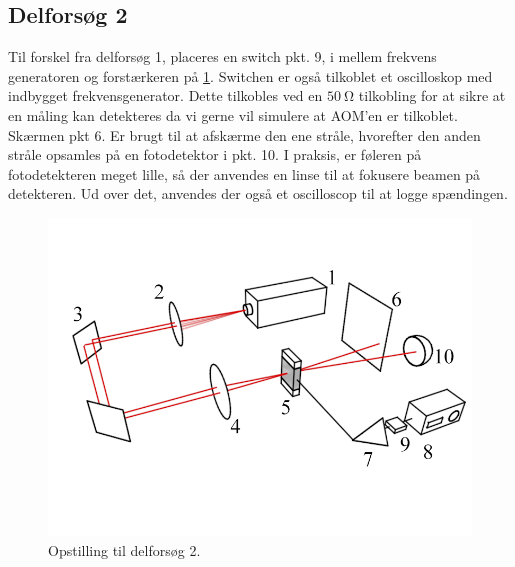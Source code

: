 \documentclass[main]{subfiles}
\begin{document}
\subsection{Delforsøg 2}\label{dataopsamling2}
Til forskel fra delforsøg 1, placeres en switch pkt. 9, i mellem frekvens generatoren og forstærkeren på \cref{fig:opstilling2}. Switchen er også tilkoblet et oscilloskop med indbygget frekvensgenerator. Dette tilkobles ved en $\SI{50}{\ohm}$ tilkobling for at sikre at en måling kan detekteres da vi gerne vil simulere at AOM'en er tilkoblet.  Skærmen pkt 6. Er brugt til at afskærme den ene stråle, hvorefter den anden stråle opsamles på en fotodetektor i pkt. 10. I praksis, er føleren på fotodetekteren meget lille, så der anvendes en linse til at fokusere beamen på detekteren. Ud over det, anvendes der også et oscilloscop til at logge spændingen.

\begin{figure}[H]
    \centering
    \includegraphics[width=\linewidth]{tegninger/tegning2.png}
    \caption{Opstilling til delforsøg 2.}
    \label{fig:opstilling2}
\end{figure}
\end{document}
